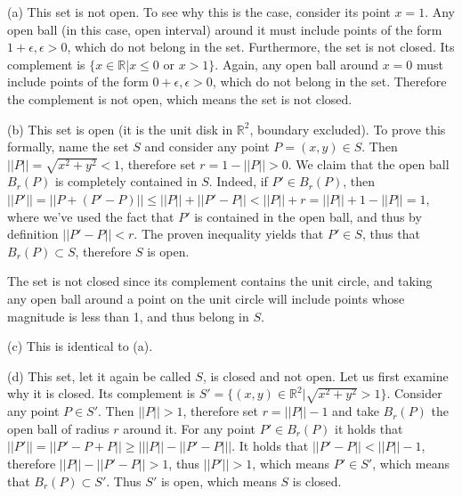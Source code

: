 \begin{solution}

    (a) This set is not open. To see why this is the case, consider its point $x=1$. Any open ball (in this case, open interval) around it must include points of the form $1+\epsilon, \epsilon > 0$, which do not belong in the set.
    Furthermore, the set is not closed. Its complement is $\{x \in \mathbb{R}\lvert x \leq 0 \text{ or } x > 1\}$. Again, any open ball around $x=0$ must include points of the form $0+\epsilon, \epsilon > 0$, which do not belong in the set. Therefore the complement is not open, which means the set is not closed.
    
    (b) This set is open (it is the unit disk in $\mathbb{R}^2$, boundary excluded). To prove this formally, name the set $S$ and consider any point $P = (x, y) \in S$. Then $\lvert \lvert P \rvert \rvert = \sqrt{x^2+y^2} < 1$, therefore set $r = 1 - \lvert \lvert P \rvert \rvert > 0$. We claim that the open ball $B_r(P)$ is completely contained in $S$. Indeed, if $P' \in B_r(P)$, then $\lvert \lvert P' \rvert \rvert = \lvert \lvert P + (P'-P) \rvert \rvert \leq \lvert \lvert P \rvert \rvert + \lvert \lvert P'-P\rvert \rvert < \lvert \lvert P \rvert \rvert + r = \lvert \lvert P \rvert \rvert + 1 - \lvert \lvert P \rvert \rvert = 1$, where we've used the fact that $P'$ is contained in the open ball, and thus by definition $\lvert \lvert P' - P \rvert \rvert < r$. The proven inequality yields that $P' \in S$, thus that $B_r(P) \subset S$, therefore $S$ is open.

    The set is not closed since its complement contains the unit circle, and taking any open ball around a point on the unit circle will include points whose magnitude is less than 1, and thus belong in $S$.

    (c) This is identical to (a).

    (d) This set, let it again be called $S$, is closed and not open. Let us first examine why it is closed. Its complement is $S' = \{(x, y) \in \mathbb{R}^2 \lvert \sqrt{x^2+y^2} > 1\}$. Consider any point $P \in S'$. Then $\lvert \lvert P \rvert \rvert > 1$, therefore set $r = \lvert \lvert P \rvert \rvert - 1$ and take $B_r(P)$ the open ball of radius $r$ around it. For any point $P' \in B_r(P)$ it holds that $\lvert \lvert P' \rvert \rvert = \lvert \lvert P' - P + P \rvert \rvert \geq \big\lvert \lvert \lvert P \rvert \rvert - \lvert \lvert P' - P \rvert \rvert \big\rvert$. It holds that $\lvert \lvert P' - P \rvert \rvert < \lvert \lvert P \rvert \rvert - 1$, therefore $\lvert \lvert P \rvert \rvert - \lvert \lvert P' - P \rvert \rvert > 1$, thus $\lvert \lvert P' \rvert \rvert > 1$, which means $P' \in S'$, which means that $B_r(P) \subset S'$. Thus $S'$ is open, which means $S$ is closed.


\end{solution}
